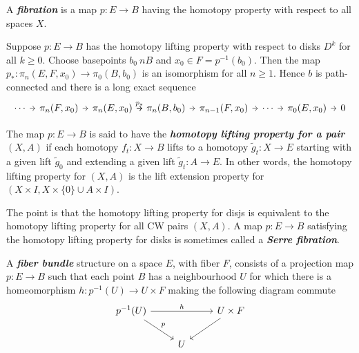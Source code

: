 \documentclass{article}
\begin{document}
\begin{itemize}
	A \textbf{\textit{fibration}} is a map $p:E\to B$ having the homotopy property with respect to all spaces $X$.
	
	\begin{thm}\label{thm:serre-fibrations-hatcher}
		Suppose $p:E\to B$ has the homotopy lifting property with respect to disks $D^k$ for all $k\geq0$. Choose basepoints $b_0\ n B$ and $x_0\in F=p^{-1}(b_0)$. Then the map $p_*:\pi_n(E,F,x_0)\to\pi_0(B,b_0)$ is an isomorphism for all $n\geq1$. Hence $b$ is path-connected and there is a long exact sequence
		\[\begin{tikzcd}[column sep=tiny]
			\cdots\arrow[r]&\pi_n(F,x_0)\arrow[r]&\pi_n(E,x_0)\arrow[r,"p_*"]\arrow[r]&\pi_n(B,b_0)\arrow[r]&\pi_{n-1}(F,x_0)\arrow[r]&\cdots\arrow[r]&\pi_0(E,x_0)\arrow[r]&0
		\end{tikzcd}\]
	\end{thm}
	
	The map $p:E\to B$ is said to have the \textbf{\textit{homotopy lifting property for a pair}} $(X,A)$ if each homotopy $f_t:X\to B$ lifts to a homotopy $\tilde{g}_t:X\to E$ starting with a given lift $\tilde{g}_0$ and extending a given lift $\tilde{g}_t:A\to E$. In other words, the homotopy lifting property for $(X,A)$ is the lift extension property for $(X\times I,X\times\{0\}\cup A\times I)$.
	
	{\color{cyan}The point is that }the homotopy lifting property for disjs is equivalent to the homotopy lifting property for all CW pairs $(X,A)$. A map $p:E\to B$ satisfying the homotopy lifting property for disks is sometimes called a \textbf{\textit{Serre fibration}}.
	
	A \textbf{\textit{fiber bundle}} structure on a space $E$, with fiber $F$, consists of a projection map $p:E\to B$ such that each point $B$ has a neighbourhood $U$ for which there is a homeomorphism $h:p^{-1}(U)\to U\times F$ making the following diagram commute
	\[\begin{tikzcd}
		p^{-1}(U)\arrow[rr,"h"]\arrow[dr,"p"]&&U\times F\arrow[dl]\\
		&U
	\end{tikzcd}\]
\end{itemize}
\end{document}
